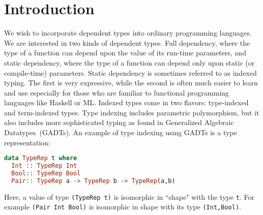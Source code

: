 \section{Introduction}
\label{sec:intro}



We wish to incorporate dependent types into ordinary programming
languages. We are interested in two kinds of dependent types.
Full dependency, where the type of a function can depend upon the value
of its run-time parameters, and static dependency, where the type
of a function can depend only upon static (or compile-time) parameters.
Static dependency is sometimes referred to as indexed typing. The first
is very expressive, while the second is often much easier to learn and 
use especially for those who are familiar to functional programming languages
like Haskell or ML.
Indexed types come in two flavors: type-indexed and term-indexed
types. Type indexing includes parametric polymorphism, but it also includes
more sophisticated typing as found in Generalized Algebraic Datatypes~(GADTs).
An example of type indexing using GADTs is a type representation:\vspace*{-2pt}
\begin{lstlisting}[basicstyle={\ttfamily\small},language=Haskell,mathescape]
data TypeRep t where
  Int :: TypeRep Int
  Bool:: TypeRep Bool
  Pair:: TypeRep a -> TypeRep b -> TypeRep(a,b)
\end{lstlisting}\vspace*{-2pt}
Here, a value of type {\tt (TypeRep t)} is isomorphic in ``shape" with
the type {\tt t}. For example {\tt (Pair Int Bool)} is isomorphic in shape
with its type {\tt (Int,Bool)}.


